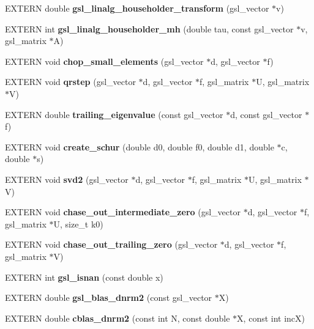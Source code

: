 \begin{CompactItemize}
\item 
EXTERN double {\bf gsl\_\-linalg\_\-householder\_\-transform} (gsl\_\-vector $\ast$v)
\item 
EXTERN int {\bf gsl\_\-linalg\_\-householder\_\-mh} (double tau, const gsl\_\-vector $\ast$v, gsl\_\-matrix $\ast$A)
\item 
EXTERN void \textbf{chop\_\-small\_\-elements} (gsl\_\-vector $\ast$d, gsl\_\-vector $\ast$f)\label{group__nr_g7a9b4689f2fcd8d6a417a071903df6f1}

\item 
EXTERN void \textbf{qrstep} (gsl\_\-vector $\ast$d, gsl\_\-vector $\ast$f, gsl\_\-matrix $\ast$U, gsl\_\-matrix $\ast$V)\label{group__nr_g8e5d28fda0cf04d6d70392fa9580c2eb}

\item 
EXTERN double \textbf{trailing\_\-eigenvalue} (const gsl\_\-vector $\ast$d, const gsl\_\-vector $\ast$f)\label{group__nr_g615603d99ef3bb2a21b32e13761a1474}

\item 
EXTERN void \textbf{create\_\-schur} (double d0, double f0, double d1, double $\ast$c, double $\ast$s)\label{group__nr_g31a6def59f109d51a7e9af63a8850f0c}

\item 
EXTERN void \textbf{svd2} (gsl\_\-vector $\ast$d, gsl\_\-vector $\ast$f, gsl\_\-matrix $\ast$U, gsl\_\-matrix $\ast$V)\label{group__nr_ge8a1bf5b51ec0f7ef1e067f01d466033}

\item 
EXTERN void \textbf{chase\_\-out\_\-intermediate\_\-zero} (gsl\_\-vector $\ast$d, gsl\_\-vector $\ast$f, gsl\_\-matrix $\ast$U, size\_\-t k0)\label{group__nr_g1b67ba06b6b7daa4f73a163f404dd3d7}

\item 
EXTERN void \textbf{chase\_\-out\_\-trailing\_\-zero} (gsl\_\-vector $\ast$d, gsl\_\-vector $\ast$f, gsl\_\-matrix $\ast$V)\label{group__nr_g15f37e448cf7eabd56ec2c351f148214}

\item 
EXTERN int \textbf{gsl\_\-isnan} (const double x)\label{group__nr_gf37b7182e24399515692cc4aa39722dd}

\item 
EXTERN double {\bf gsl\_\-blas\_\-dnrm2} (const gsl\_\-vector $\ast$X)
\item 
EXTERN double \textbf{cblas\_\-dnrm2} (const int N, const double $\ast$X, const int incX)\label{group__nr_g7201c3bc9f98c0b703b326b9178c4965}


\end{CompactItemize}
